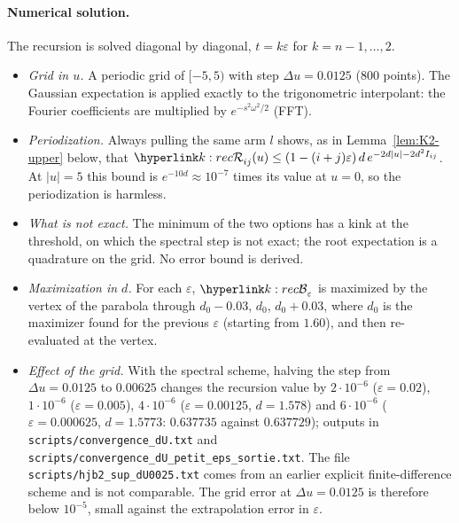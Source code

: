 \documentclass[11pt]{article}
\newcommand{\1}{\mathbf{1}}
\begin{document}
\paragraph{Numerical solution.} The recursion is solved diagonal by diagonal, $t=k\varepsilon$ for $k=n-1,\dots,2$.
\begin{itemize}
\item \emph{Grid in $u$.} A periodic grid of $[-5,5)$ with step $\Delta u=0.0125$ (800 points). The Gaussian expectation is applied exactly to the trigonometric
interpolant: the Fourier coefficients are multiplied by $e^{-s^2\omega^2/2}$ (FFT).
\item \emph{Periodization.} Always pulling the same arm $l$ shows, as in Lemma~\ref{lem:K2-upper} below, that $\kR_{ij}(u)\le(1-(i+j)\varepsilon)\,d\,e^{-2d|u|-2d^2I_{ij}}$.
At $|u|=5$ this bound is $e^{-10d}\approx10^{-7}$ times its value at $u=0$, so the periodization is harmless.
\item \emph{What is not exact.} The minimum of the two options has a kink at the threshold, on which the spectral step is not exact; the root expectation is a
quadrature on the grid. No error bound is derived.
\item \emph{Maximization in $d$.} For each $\varepsilon$, $\kB_\varepsilon$ is maximized by the vertex of the parabola through $d_0-0.03$, $d_0$, $d_0+0.03$, where $d_0$ is the
maximizer found for the previous $\varepsilon$ (starting from $1.60$), and then re-evaluated at the vertex.
\item \emph{Effect of the grid.} With the spectral scheme, halving the step from $\Delta u=0.0125$ to $0.00625$ changes the recursion value by $2\cdot10^{-6}$
($\varepsilon=0.02$), $1\cdot10^{-6}$ ($\varepsilon=0.005$), $4\cdot10^{-6}$ ($\varepsilon=0.00125$, $d=1.578$) and $6\cdot10^{-6}$ ($\varepsilon=0.000625$, $d=1.5773$:
$0.637735$ against $0.637729$); outputs in \texttt{scripts/convergence\_dU.txt} and \texttt{scripts/convergence\_dU\_petit\_eps\_sortie.txt}. The file
\texttt{scripts/hjb2\_sup\_dU0025.txt} comes from an earlier explicit finite-difference scheme and is not comparable. The grid error at $\Delta u=0.0125$ is therefore
below $10^{-5}$, small against the extrapolation error in $\varepsilon$.
\end{itemize}
\end{document}
